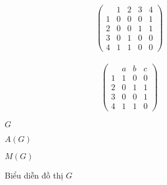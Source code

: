 \begin{figure}[h]
	\begin{center}
		\begin{minipage}[c]{0.3\textwidth}
		\end{minipage}
		\begin{minipage}[c]{0.3\textwidth}
			\begin{align*}
				\left(
					\begin{array}{c|cccc}
						&1&2&3&4\\\hline
						1&0&0&0&1\\
						2&0&0&1&1\\
						3&0&1&0&0\\
						4&1&1&0&0
					\end{array}
				\right)
			\end{align*}
		\end{minipage}
		\begin{minipage}[c]{0.3\textwidth}
			\begin{align*}
				\left(
					\begin{array}{c|ccc}
						 &a&b&c\\\hline
						1&1&0&0\\
						2&0&1&1\\
						3&0&0&1\\
						4&1&1&0
					\end{array}
				\right)
			\end{align*}
		\end{minipage}\par
		\begin{minipage}{0.3\textwidth}\begin{center}$G$\end{center}\end{minipage}
		\begin{minipage}{0.3\textwidth}\begin{center}$A(G)$\end{center}\end{minipage}
		\begin{minipage}{0.3\textwidth}\begin{center}$M(G)$\end{center}\end{minipage}
	\end{center}
	\caption{Biểu diễn đồ thị $G$}
	\label{fig:bieu-dien-do-thi-g}
\end{figure}

